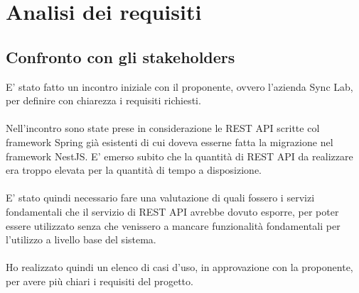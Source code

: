 
\chapter{Analisi dei requisiti}
\label{cap:analisi-requisiti}

\section{Confronto con gli stakeholders}
E' stato fatto un incontro iniziale con il proponente, ovvero l'azienda Sync Lab,
per definire con chiarezza i requisiti richiesti.
\\\\
Nell'incontro sono state prese in considerazione le REST API scritte col framework Spring 
già esistenti di cui doveva esserne fatta la migrazione nel framework NestJS.
E' emerso subito che la quantità di REST API da realizzare era troppo elevata per la
quantità di tempo a disposizione. 
\\\\
E' stato quindi necessario fare una valutazione di quali fossero i servizi fondamentali che
il servizio di REST API avrebbe dovuto esporre, per poter essere utilizzato senza che venissero
a mancare funzionalità fondamentali per l'utilizzo a livello base del sistema.
\\\\
Ho realizzato quindi un elenco di casi d'uso, in approvazione con la proponente, per avere più
chiari i requisiti del progetto.

